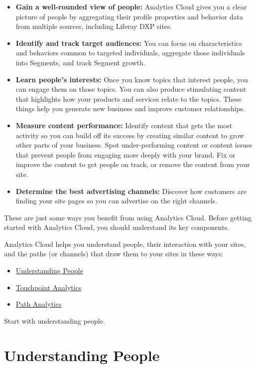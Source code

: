 \begin{itemize}
\item
  \textbf{Gain a well-rounded view of people:} Analytics Cloud gives you
  a clear picture of people by aggregating their profile properties and
  behavior data from multiple sources, including Liferay DXP sites.
\item
  \textbf{Identify and track target audiences:} You can focus on
  characteristics and behaviors common to targeted individuals,
  aggregate those individuals into Segments, and track Segment growth.
\item
  \textbf{Learn people's interests:} Once you know topics that interest
  people, you can engage them on those topics. You can also produce
  stimulating content that highlights how your products and services
  relate to the topics. These things help you generate new business and
  improve customer relationships.
\item
  \textbf{Measure content performance:} Identify content that gets the
  most activity so you can build off its success by creating similar
  content to grow other parts of your business. Spot under-performing
  content or content issues that prevent people from engaging more
  deeply with your brand. Fix or improve the content to get people on
  track, or remove the content from your site.
\item
  \textbf{Determine the best advertising channels:} Discover how
  customers are finding your site pages so you can advertise on the
  right channels.
\end{itemize}

These are just some ways you benefit from using Analytics Cloud. Before
getting started with Analytics Cloud, you should understand its key
components.

Analytics Cloud helps you understand people, their interaction with your
sites, and the paths (or channels) that draw them to your sites in these
ways:

\begin{itemize}
\item
  \hyperref[understanding-people]{Understanding People}
\item
  \hyperref[touchpoint-analytics]{Touchpoint Analytics}
\item
  \hyperref[path-analytics]{Path Analytics}
\end{itemize}

Start with understanding people.

\section{Understanding People}\label{understanding-people}

